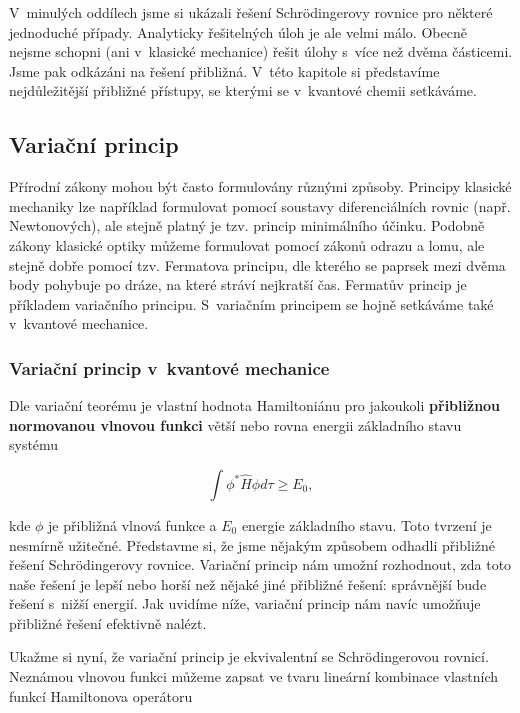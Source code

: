 V~minulých oddílech jsme si ukázali řešení Schr\"{o}dingerovy rovnice pro některé jednoduché případy. Analyticky řešitelných úloh je ale velmi málo. Obecně nejsme schopni (ani v~klasické mechanice) řešit úlohy s~více než dvěma částicemi. Jsme pak odkázáni na řešení přibližná. V~této kapitole si představíme nejdůležitější přibližné přístupy, se kterými se v~kvantové chemii setkáváme.

\subsection{Variační princip}

Přírodní zákony mohou být často formulovány různými způsoby. Principy klasické mechaniky lze například formulovat pomocí soustavy diferenciálních rovnic (např. Newtonových), ale stejně platný je tzv. princip minimálního účinku. Podobně zákony klasické optiky můžeme formulovat pomocí zákonů odrazu a lomu, ale stejně dobře pomocí tzv. Fermatova principu, dle kterého se paprsek mezi dvěma body pohybuje po dráze, na které stráví nejkratší čas. Fermatův princip je příkladem variačního principu. S~variačním principem se hojně setkáváme také v~kvantové mechanice. 

\subsubsection{Variační princip v~kvantové mechanice}

Dle variační teorému je vlastní hodnota Hamiltoniánu pro jakoukoli \textbf{přibližnou normovanou vlnovou funkci} větší nebo rovna energii základního stavu systému

\begin{equation}
\boxed{\int\phi^*\hat{H}\phi d\tau\geq E_0,}
\label{rov:aprox-variacniteorem}
\end{equation}

\noindent kde $ \phi $ je přibližná vlnová funkce a $ E_0 $ energie základního stavu. Toto tvrzení je nesmírně užitečné. Představme si, že jsme nějakým způsobem odhadli přibližné řešení Schr\"{o}dingerovy rovnice. Variační princip nám umožní rozhodnout, zda toto naše řešení je lepší nebo horší než nějaké jiné přibližné řešení: správnější bude řešení s~nižší energií. Jak uvidíme níže, variační princip nám navíc umožňuje přibližné řešení efektivně nalézt. 


 Ukažme si nyní, že variační princip je ekvivalentní se Schr\"{o}dingerovou rovnicí. Neznámou vlnovou funkci můžeme zapsat ve tvaru lineární kombinace vlastních funkcí Hamiltonova operátoru

